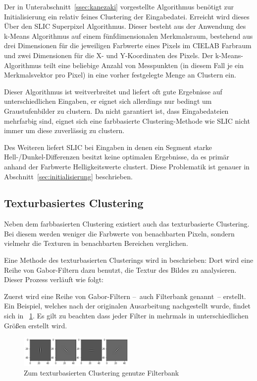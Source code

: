 Der in Unterabschnitt~\ref{ssec:kanezaki} vorgestellte Algorithmus benötigt zur Initialisierung ein relativ feines Clustering der Eingabedatei. Erreicht wird dieses Über den SLIC Superpixel Algorithmus. Dieser besteht aus der Anwendung des k-Means Algorithmus auf einem fünfdimensionalen Merkmalsraum, bestehend aus drei Dimensionen für die jeweiligen Farbwerte eines Pixels im CIELAB Farbraum und zwei Dimensionen für die X- und Y-Koordinaten des Pixels. \cite{achanta_10} Der k-Means-Algorithmus teilt eine beliebige Anzahl von Messpunkten (in diesem Fall je ein Merkmalsvektor pro Pixel) in eine vorher festgelegte Menge an Clustern ein.

Dieser Algorithmus ist weitverbreitet und liefert oft gute Ergebnisse auf unterschiedlichen Eingaben, er eignet sich allerdings nur bedingt um Graustufenbilder zu clustern. Da nicht garantiert ist, dass Eingabedateien mehrfarbig sind, eignet sich eine farbbasierte Clustering-Methode wie SLIC nicht immer um diese zuverlässig zu clustern. 

Des Weiteren liefert SLIC bei Eingaben in denen ein Segment starke Hell-/Dunkel-Differenzen besitzt keine optimalen Ergebnisse, da es primär anhand der Farbwerte \bzw Helligkeitswerte clustert. Diese Problematik ist genauer in Abschnitt~\ref{sec:initialisierung} beschrieben.

\subsection{Texturbasiertes Clustering}
\label{ssec:tsugf}

Neben dem farbbasierten Clustering existiert auch das texturbasierte Clustering. Bei diesem werden weniger die Farbwerte von benachbarten Pixeln, sondern vielmehr die Texturen in benachbarten Bereichen verglichen.

Eine Methode des texturbasierten Clusterings wird in \cite{jain_91} beschrieben: Dort wird eine Reihe von Gabor-Filtern dazu benutzt, die Textur des Bildes zu analysieren. Dieser Prozess verläuft wie folgt:

Zuerst wird eine Reihe von Gabor-Filtern --~auch Filterbank genannt~-- erstellt. Ein Beispiel, welches nach der originalen Ausarbeitung nachgestellt wurde, findet sich in \figurename~\ref{fig:tsugf_filters}. Es gilt zu beachten dass jeder Filter in mehrmals in unterschiedlichen Größen erstellt wird.

\begin{figure}[h!]
	\centering
	\includegraphics[width=0.5\textwidth,keepaspectratio]{images/gen/GEN_tsugf_filterbank.png}
	\captionsetup{width=0.5\textwidth,format=plain}
	\caption{Zum texturbasierten Clustering genutze Filterbank}
	\label{fig:tsugf_filters}
\end{figure}

